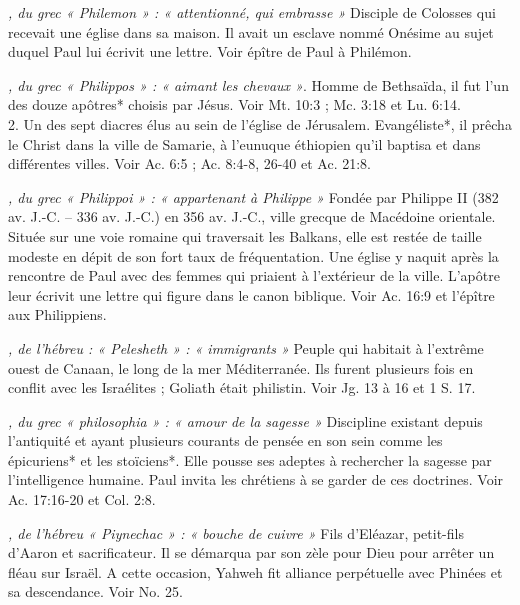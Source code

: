 \begin{multicols}{2}
\textit{, du grec « Philemon » : « attentionné, qui embrasse »}\newline
Disciple de Colosses qui recevait une église dans sa maison. Il avait un esclave nommé Onésime au sujet duquel Paul lui écrivit une lettre. Voir épître de Paul à Philémon.

\textit{, du grec « Philippos » : « aimant les chevaux »}. Homme de Bethsaïda, il fut l'un des douze apôtres* choisis par Jésus. Voir Mt. 10:3 ; Mc. 3:18 et Lu. 6:14.
\\2. Un des sept diacres élus au sein de l'église de Jérusalem. Evangéliste*, il prêcha le Christ dans la ville de Samarie, à l'eunuque éthiopien qu'il baptisa et dans différentes villes. Voir Ac. 6:5 ; Ac. 8:4-8, 26-40 et Ac. 21:8.

\textit{, du grec « Philippoi » : « appartenant à Philippe »}\newline
Fondée par Philippe II (382 av. J.-C. – 336 av. J.-C.) en 356 av. J.-C., ville grecque de Macédoine orientale. Située sur une voie romaine qui traversait les Balkans, elle est restée de taille modeste en dépit de son fort taux de fréquentation. Une église y naquit après la rencontre de Paul avec des femmes qui priaient à l'extérieur de la ville. L'apôtre leur écrivit une lettre qui figure dans le canon biblique. Voir Ac. 16:9 et l'épître aux Philippiens.

\textit{, de l'hébreu : « Pelesheth » : « immigrants »}\newline
Peuple qui habitait à l'extrême ouest de Canaan, le long de la mer Méditerranée. Ils furent plusieurs fois en conflit avec les Israélites ; Goliath était philistin. Voir Jg. 13 à 16 et 1 S. 17.

\textit{, du grec « philosophia » : « amour de la sagesse »}\newline
Discipline existant depuis l'antiquité et ayant plusieurs courants de pensée en son sein comme les épicuriens* et les stoïciens*. Elle pousse ses adeptes à rechercher la sagesse par l'intelligence humaine. Paul invita les chrétiens à se garder de ces doctrines. Voir Ac. 17:16-20 et Col. 2:8.

\textit{, de l'hébreu « Piynechac » : « bouche de cuivre »}\newline
Fils d'Eléazar, petit-fils d'Aaron et sacrificateur. Il se démarqua par son zèle pour Dieu pour arrêter un fléau sur Israël. A cette occasion, Yahweh fit alliance perpétuelle avec Phinées et sa descendance. Voir No. 25.


\end{multicols}

